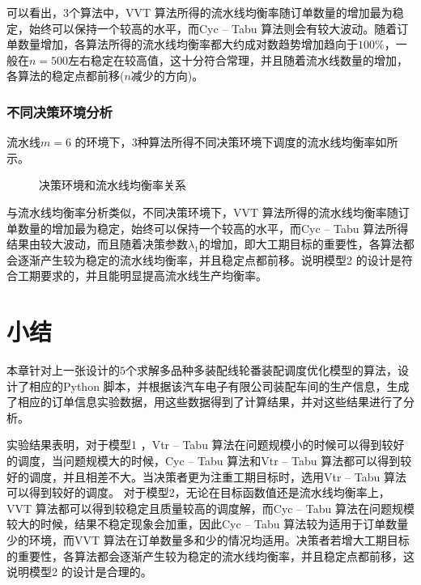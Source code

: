 可以看出，$3$个算法中，VVT 算法所得的流水线均衡率随订单数量的增加最为稳定，始终可以保持一个较高的水平，而Cyc -- Tabu 算法则会有较大波动。随着订单数量增加，各算法所得的流水线均衡率都大约成对数趋势增加趋向于$100\%$，一般在$n = 500$左右稳定在较高值，这十分符合常理，并且随着流水线数量的增加，各算法的稳定点都前移($n$减少的方向)。

\subsubsection{不同决策环境分析}
流水线$m = 6$ 的环境下，$3$种算法所得不同决策环境下调度的流水线均衡率如所示。
\begin{figure}
\centering
{}
\caption{决策环境和流水线均衡率关系}\label{fig:decisionvsrate}
\end{figure}

与流水线均衡率分析类似，不同决策环境下，VVT 算法所得的流水线均衡率随订单数量的增加最为稳定，始终可以保持一个较高的水平，而Cyc -- Tabu 算法所得结果由较大波动，而且随着决策参数$\lambda_1$的增加，即大工期目标的重要性，各算法都会逐渐产生较为稳定的流水线均衡率，并且稳定点都前移。说明模型2 的设计是符合工期要求的，并且能明显提高流水线生产均衡率。

\section{小结}
本章针对上一张设计的$5$个求解多品种多装配线轮番装配调度优化模型的算法，设计了相应的Python 脚本，并根据该汽车电子有限公司装配车间的生产信息，生成了相应的订单信息实验数据，用这些数据得到了计算结果，并对这些结果进行了分析。

实验结果表明，对于模型1 ，Vtr -- Tabu 算法在问题规模小的时候可以得到较好的调度，当问题规模大的时候，Cyc -- Tabu 算法和Vtr -- Tabu  算法都可以得到较好的调度，并且相差不大。当决策者更为注重工期目标时，选用Vtr -- Tabu 算法可以得到较好的调度。
对于模型2，无论在目标函数值还是流水线均衡率上，VVT 算法都可以得到较稳定且质量较高的调度解，而Cyc -- Tabu 算法在问题规模较大的时候，结果不稳定现象会加重，因此Cyc -- Tabu 算法较为适用于订单数量少的环境，而VVT 算法在订单数量多和少的情况均适用。决策者若增大工期目标的重要性，各算法都会逐渐产生较为稳定的流水线均衡率，并且稳定点都前移，这说明模型2 的设计是合理的。